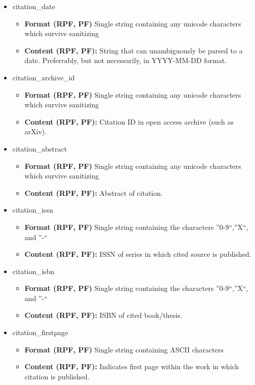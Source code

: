 \documentclass[
a4paper,
12pt,
]
{article}
\begin{document}
\begin{itemize}
    \item citation\_date \begin{itemize} \item \textbf{Format (RPF, PF)} Single string containing any unicode characters which survive sanitizing \item \textbf{Content (RPF, PF):} String that can unambiguously be parsed to a date. Preferrably, but not necessarily, in YYYY-MM-DD format. \end{itemize}
   \item citation\_archive\_id \begin{itemize} \item \textbf{Format (RPF, PF)} Single string containing any unicode characters which survive sanitizing \item \textbf{Content (RPF, PF):} Citation ID in open access archive (such as arXiv). \end{itemize}
   \item citation\_abstract \begin{itemize} \item \textbf{Format (RPF, PF)} Single string containing any unicode characters which survive sanitizing \item \textbf{Content (RPF, PF):} Abstract of citation. \end{itemize}
   \item citation\_issn \begin{itemize} \item \textbf{Format (RPF, PF)} Single string containing the characters ''0-9``,''X``, and ''-`` \item \textbf{Content (RPF, PF):} ISSN of series in which cited source is published. \end{itemize}
   \item citation\_isbn \begin{itemize} \item \textbf{Format (RPF, PF)} Single string containing the characters ''0-9``,''X``, and ''-`` \item \textbf{Content (RPF, PF):} ISBN of cited book/thesis. \end{itemize}
   \item citation\_firstpage \begin{itemize} \item \textbf{Format (RPF, PF)} Single string containing ASCII characters \item \textbf{Content (RPF, PF):} Indicates first page within the work in which citation is published. \end{itemize}

\end{itemize}
\end{document}
